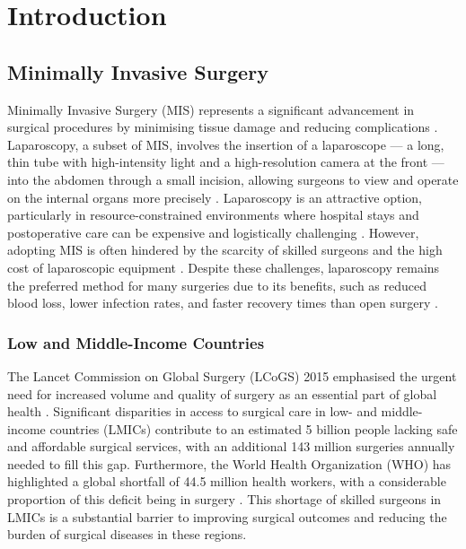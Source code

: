 \section{Introduction}

\subsection{Minimally Invasive Surgery}

Minimally Invasive Surgery (MIS) represents a significant advancement in surgical procedures by minimising tissue damage and reducing complications \cite{jaffray_minimally_2005}. Laparoscopy, a subset of MIS, involves the insertion of a laparoscope — a long, thin tube with high-intensity light and a high-resolution camera at the front — into the abdomen through a small incision, allowing surgeons to view and operate on the internal organs more precisely \cite{monnet_laparoscopy_2003}. Laparoscopy is an attractive option, particularly in resource-constrained environments where hospital stays and postoperative care can be expensive and logistically challenging \cite{rockall_laparoscopy_2014}. However, adopting MIS is often hindered by the scarcity of skilled surgeons and the high cost of laparoscopic equipment \cite{meara_global_2015}. Despite these challenges, laparoscopy remains the preferred method for many surgeries due to its benefits, such as reduced blood loss, lower infection rates, and faster recovery times than open surgery \cite{jaffray_minimally_2005}.

\subsubsection{Low and Middle-Income Countries}

The Lancet Commission on Global Surgery (LCoGS) 2015 emphasised the urgent need for increased volume and quality of surgery as an essential part of global health \cite{meara_global_2015}. Significant disparities in access to surgical care in low- and middle-income countries (LMICs) contribute to an estimated 5 billion people lacking safe and affordable surgical services, with an additional 143 million surgeries annually needed to fill this gap. Furthermore, the World Health Organization (WHO) has highlighted a global shortfall of 44.5 million health workers, with a considerable proportion of this deficit being in surgery \cite{world_health_organization_world_2016}. This shortage of skilled surgeons in LMICs is a substantial barrier to improving surgical outcomes and reducing the burden of surgical diseases in these regions. 

